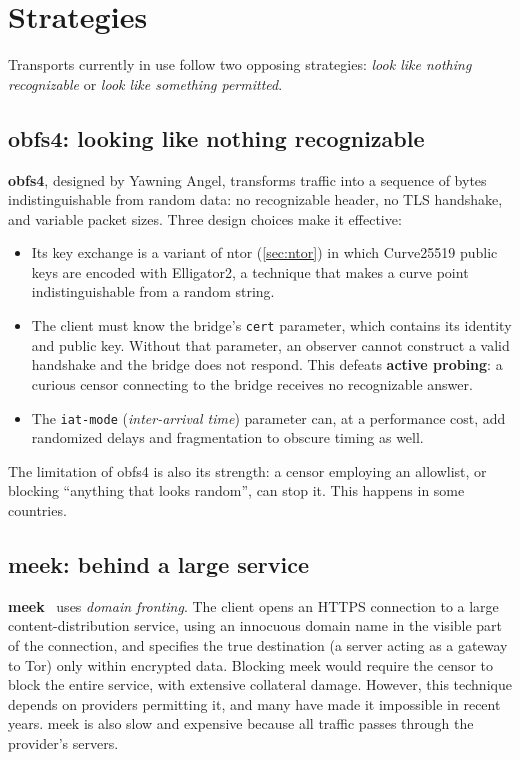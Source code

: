 \section{Strategies}\label{sec:cens-strategie}

Transports currently in use follow two opposing strategies: \emph{look like nothing recognizable} or \emph{look like something permitted}.

\subsection{obfs4: looking like nothing recognizable}

\textbf{obfs4}, designed by Yawning Angel, transforms traffic into a sequence of bytes indistinguishable from random data: no recognizable header, no TLS handshake, and variable packet sizes. Three design choices make it effective:
\begin{itemize}
  \item Its key exchange is a variant of ntor (\cref{sec:ntor}) in which Curve25519 public keys are encoded with Elligator2, a technique that makes a curve point indistinguishable from a random string.
  \item The client must know the bridge's \texttt{cert} parameter, which contains its identity and public key. Without that parameter, an observer cannot construct a valid handshake and the bridge does not respond. This defeats \textbf{active probing}: a curious censor connecting to the bridge receives no recognizable answer.
  \item The \texttt{iat-mode} (\emph{inter-arrival time}) parameter can, at a performance cost, add randomized delays and fragmentation to obscure timing as well.
\end{itemize}
The limitation of obfs4 is also its strength: a censor employing an allowlist, or blocking \enquote{anything that looks random}, can stop it. This happens in some countries.

\subsection{meek: behind a large service}

\textbf{meek}~\cite{fifield2015fronting} uses \emph{domain fronting}. The client opens an HTTPS connection to a large content-distribution service, using an innocuous domain name in the visible part of the connection, and specifies the true destination (a server acting as a gateway to Tor) only within encrypted data. Blocking meek would require the censor to block the entire service, with extensive collateral damage. However, this technique depends on providers permitting it, and many have made it impossible in recent years. meek is also slow and expensive because all traffic passes through the provider's servers.

